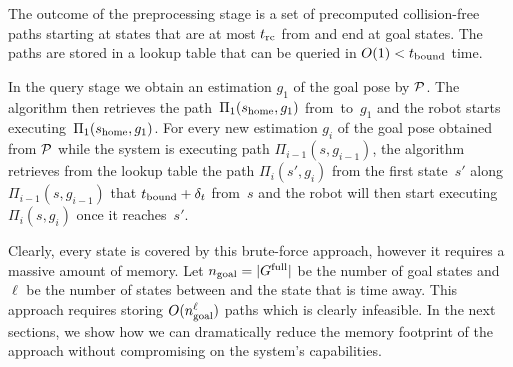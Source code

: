 \documentclass[conference]{IEEEtran}
\begin{document}
The outcome of the preprocessing stage is a set of precomputed collision-free paths starting at states that are at most $t_{\textrm{rc}}$ from \Shome and end at goal states.
The paths are stored in a lookup table that can be queried in $O(1) < t_{\textrm{bound}}$ time.

In the query stage we obtain an estimation $g_1$ of the goal pose by $\mathcal{P}$. 
The algorithm then retrieves the path~$\Pi_1(s_{\textrm{home}},g_1)$ from~\Shome to~$g_1$ and the robot starts executing~$\Pi_1(s_{\textrm{home}},g_1)$.
%
For every new estimation $g_i$ of the goal pose obtained from $\mathcal{P}$  while the system is executing path $\Pi_{i-1}(s,g_{i-1})$, the algorithm retrieves from the lookup table the path $\Pi_i(s',g_i)$ from the first state~$s'$ along $\Pi_{i-1}(s,g_{i-1})$ that $t_{\textrm{bound}} + \delta_t$ from~$s$ and the robot will then start executing~$\Pi_i(s,g_i)$ once it reaches~$s'$.

Clearly, every state is covered by this brute-force approach, however it requires a massive amount of memory.
Let $n_{\rm goal} = \vert G^{\textrm{full}} \vert$ be the number of goal states and
$\ell$ be the number of states between \Shome and the state that is \Trc time away.
This approach requires storing $O(n_{\rm goal}^\ell)$ paths which is clearly infeasible.
In the next sections, we show how we can dramatically reduce the memory footprint of the approach without compromising on the system's capabilities.
\end{document}
